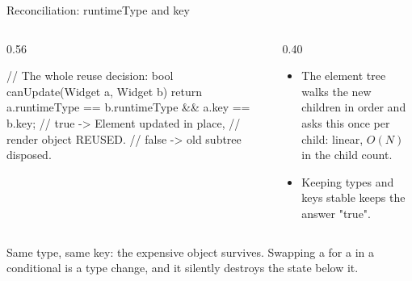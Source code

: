 \documentclass[10pt,aspectratio=169,t]{beamer}
\begin{document}
\begin{frame}[fragile,eyebrow=Rendering]{Reconciliation: runtimeType and key}
  \begin{columns}[T]
    \begin{column}{0.56\textwidth}
\begin{dart}
// The whole reuse decision:
bool canUpdate(Widget a, Widget b) {
  return a.runtimeType == b.runtimeType
      && a.key == b.key;
}
// true  -> Element updated in place,
//          render object REUSED.
// false -> old subtree disposed.
\end{dart}
    \end{column}
    \begin{column}{0.40\textwidth}
      \begin{itemize}
        \item The element tree walks the new children in order and asks this once per child: linear, \(O(N)\) in the child count.
        \item Keeping types and keys stable keeps the answer "true".
      \end{itemize}
    \end{column}
  \end{columns}
  \begin{takeaway}{Same type, same key: the expensive object survives.}
    Swapping a  for a  in a conditional is a type change, and it silently destroys the state below it.
  \end{takeaway}
\end{frame}
\end{document}

